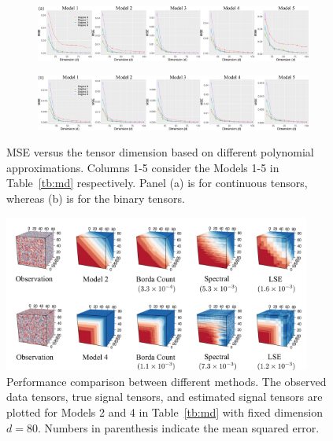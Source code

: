 \documentclass[11pt]{article}
\theoremstyle{definition}
\begin{document}
\begin{figure}[h!]
    \centering
    \begin{subfigure}[b]{\textwidth}
    \vspace{0.5cm}
    
    \includegraphics[width = \textwidth]{figure/deg_dim_c.pdf} 
    \vspace{0cm}
    \end{subfigure}
    \begin{subfigure}[b]{\textwidth}
    \includegraphics[width =\textwidth]{figure/deg_dim_b.pdf}    
    \end{subfigure}
    \caption{MSE versus the tensor dimension based on different polynomial approximations. Columns 1-5 consider the Models 1-5 in Table~\ref{tb:md} respectively. Panel (a) is for continuous tensors, whereas (b) is for the binary tensors.}
    \label{fig:degdim}
\end{figure}


\begin{figure}[htp!]
    \centering
    \includegraphics[width =0.9\textwidth]{figure/extravfinal.pdf}
    \caption{Performance comparison between different methods. The observed data tensors, true signal tensors, and estimated signal tensors are plotted for Models 2 and 4 in Table~\ref{tb:md} with fixed dimension $d = 80$. Numbers in parenthesis indicate the mean squared error.}
    \label{fig:extrav}
\end{figure}
\end{document}
